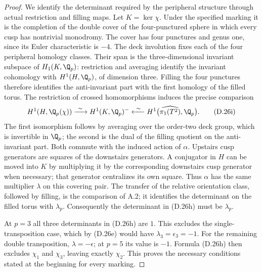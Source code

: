 \begin{proof}
We identify the determinant required by the peripheral
structure through actual restriction and filling maps.
Let $K=\ker\chi$. Under the specified marking it is the
completion of the double cover of the four-punctured
sphere in which every cusp has nontrivial monodromy.
The cover has four punctures and genus one, since its
Euler characteristic is $-4$. The deck involution fixes
each of the four peripheral homology classes. Their
span is the three-dimensional invariant subspace of
$H_1(K,\Q_p)$: restriction and averaging identify the
invariant cohomology with $H^1(H,\Q_p)$, of dimension
three. Filling the four punctures therefore identifies
the anti-invariant part with the first homology of the
filled torus. The restriction of crossed homomorphisms
induces the precise comparison
\[
 H^1(H,\Q_p(\chi))
   \xrightarrow{\ \sim\ }H^1(K,\Q_p)^-
   \xleftarrow{\ \sim\ }
          H^1\bigl(\widehat{\pi_1(T^2)},\Q_p\bigr).
                                                               \tag{D.26i}
\]
The first isomorphism follows by averaging over the
order-two deck group, which is invertible in $\Q_p$;
the second is the dual of the filling quotient on
the anti-invariant part. Both commute with the induced
action of $\alpha$. Upstairs cusp generators are squares
of the downstairs generators. A conjugator in $H$ can
be moved into $K$ by multiplying it by the corresponding
downstairs cusp generator when necessary; that generator
centralizes its own square. Thus $\alpha$ has the same
multiplier $\lambda$ on this covering pair. The transfer
of the relative orientation class, followed by filling,
is the comparison of A.2; it identifies the determinant
on the filled torus with $\lambda_p$. Consequently the
determinant in (D.26h) must be $\lambda_p$.

At $p=3$ all three determinants in (D.26h) are $1$.
This excludes the single-transposition case, which by
(D.26e) would have $\lambda_3=\epsilon_3=-1$.
For the remaining double transposition,
$\lambda=-\epsilon$; at $p=5$ its value is $-1$.
Formula (D.26h) then excludes $\chi_1$ and $\chi_3$,
leaving exactly $\chi_2$. This proves the necessary
conditions stated at the beginning for every marking.


\end{proof}
